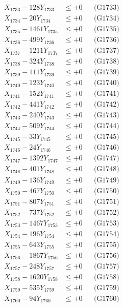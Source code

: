 \documentclass[a4paper,10pt]{article}
\begin{document}
{\begin{align}
X_{1733} - 128Y_{1733} &\leq +0 && \text{(G1733)} \\
X_{1734} - 20Y_{1734} &\leq +0 && \text{(G1734)} \\
X_{1735} - 1461Y_{1735} &\leq +0 && \text{(G1735)} \\
X_{1736} - 499Y_{1736} &\leq +0 && \text{(G1736)} \\
X_{1737} - 1211Y_{1737} &\leq +0 && \text{(G1737)} \\
X_{1738} - 324Y_{1738} &\leq +0 && \text{(G1738)} \\
X_{1739} - 111Y_{1739} &\leq +0 && \text{(G1739)} \\
X_{1740} - 123Y_{1740} &\leq +0 && \text{(G1740)} \\
\allowbreak
X_{1741} - 152Y_{1741} &\leq +0 && \text{(G1741)} \\
X_{1742} - 441Y_{1742} &\leq +0 && \text{(G1742)} \\
X_{1743} - 240Y_{1743} &\leq +0 && \text{(G1743)} \\
X_{1744} - 509Y_{1744} &\leq +0 && \text{(G1744)} \\
X_{1745} - 33Y_{1745} &\leq +0 && \text{(G1745)} \\
X_{1746} - 24Y_{1746} &\leq +0 && \text{(G1746)} \\
X_{1747} - 1392Y_{1747} &\leq +0 && \text{(G1747)} \\
X_{1748} - 401Y_{1748} &\leq +0 && \text{(G1748)} \\
X_{1749} - 136Y_{1749} &\leq +0 && \text{(G1749)} \\
X_{1750} - 467Y_{1750} &\leq +0 && \text{(G1750)} \\
\allowbreak
X_{1751} - 807Y_{1751} &\leq +0 && \text{(G1751)} \\
X_{1752} - 737Y_{1752} &\leq +0 && \text{(G1752)} \\
X_{1753} - 1467Y_{1753} &\leq +0 && \text{(G1753)} \\
X_{1754} - 196Y_{1754} &\leq +0 && \text{(G1754)} \\
X_{1755} - 643Y_{1755} &\leq +0 && \text{(G1755)} \\
X_{1756} - 1867Y_{1756} &\leq +0 && \text{(G1756)} \\
X_{1757} - 248Y_{1757} &\leq +0 && \text{(G1757)} \\
X_{1758} - 1620Y_{1758} &\leq +0 && \text{(G1758)} \\
X_{1759} - 535Y_{1759} &\leq +0 && \text{(G1759)} \\
X_{1760} - 94Y_{1760} &\leq +0 && \text{(G1760)} \\

\end{align}}
\end{document}
